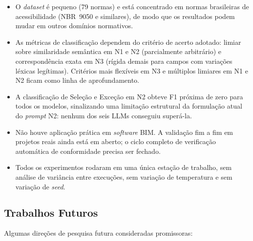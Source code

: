 \documentclass[a4paper,fleqn]{cas-sc}
\begin{document}
\begin{itemize}
    \item O \textit{dataset} é pequeno (79 normas) e está concentrado em normas brasileiras de acessibilidade (NBR~9050 e similares), de modo que os resultados podem mudar em outros domínios normativos.
    \item As métricas de classificação dependem do critério de acerto adotado: limiar sobre similaridade semântica em N1 e N2 (parcialmente arbitrário) e correspondência exata em N3 (rígida demais para campos com variações léxicas legítimas). Critérios mais flexíveis em N3 e múltiplos limiares em N1 e N2 ficam como linha de aprofundamento.
    \item A classificação de Seleção e Exceção em N2 obteve F1 próxima de zero para todos os modelos, sinalizando uma limitação estrutural da formulação atual do \textit{prompt} N2: nenhum dos seis LLMs conseguiu superá-la.
    \item Não houve aplicação prática em \textit{software} BIM. A validação fim a fim em projetos reais ainda está em aberto; o ciclo completo de verificação automática de conformidade precisa ser fechado.
    \item Todos os experimentos rodaram em uma única estação de trabalho, sem análise de variância entre execuções, sem variação de temperatura e sem variação de \textit{seed}.
\end{itemize}

\subsection{Trabalhos Futuros}

Algumas direções de pesquisa futura consideradas promissoras:
\end{document}
